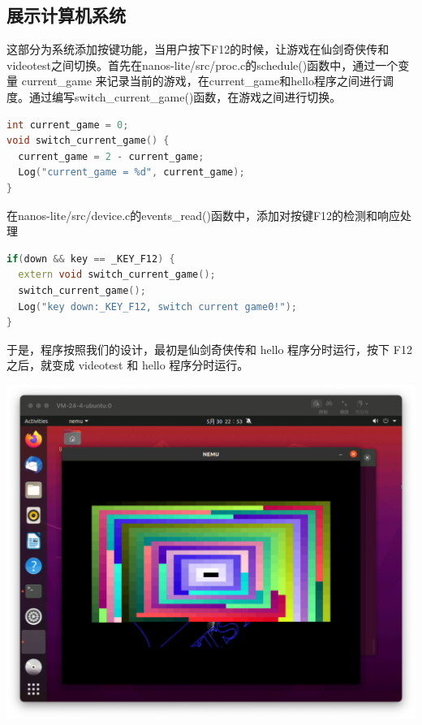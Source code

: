 \documentclass[UTF8,a4paper,10pt]{ctexart}
\begin{document}
\subsection{展示计算机系统}
这部分为系统添加按键功能，当用户按下F12的时候，让游戏在仙剑奇侠传和videotest之间切换。首先在nanos-lite/src/proc.c的schedule()函数中，通过一个变量 current\_game 来记录当前的游戏，在current\_game和hello程序之间进行调度。通过编写switch\_current\_game()函数，在游戏之间进行切换。
\begin{lstlisting}[language = C++]
int current_game = 0;
void switch_current_game() {
  current_game = 2 - current_game;
  Log("current_game = %d", current_game);
}
\end{lstlisting}
在nanos-lite/src/device.c的events\_read()函数中，添加对按键F12的检测和响应处理
\begin{lstlisting}[language = C++]
if(down && key == _KEY_F12) {
  extern void switch_current_game();
  switch_current_game();
  Log("key down:_KEY_F12, switch current game0!");
}
\end{lstlisting}
于是，程序按照我们的设计，最初是仙剑奇侠传和 hello 程序分时运行，按下 F12 之后，就变成 videotest 和 hello 程序分时运行。
\begin{center}
  \includegraphics*[scale=0.35]{img/16.png}
\end{center}
\end{document}
